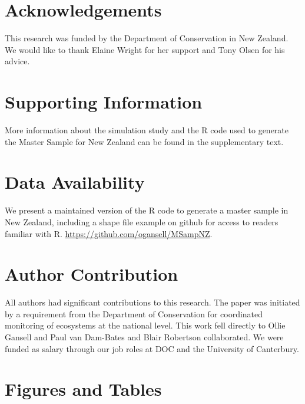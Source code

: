 \documentclass[titlepage]{article}
\begin{document}
\section{Acknowledgements}
This research was funded by the Department of Conservation in New Zealand. We would like to thank Elaine Wright for her support and Tony Olsen for his advice.

	

\section{Supporting Information}
More information about the simulation study and the R code used to generate the Master Sample for New Zealand can be found in the supplementary text.

\section{Data Availability}
We present a maintained version of the R code to generate a master sample in New Zealand, including a shape file example on github for access to readers familiar with R. \url{https://github.com/ogansell/MSampNZ}.

\section{Author Contribution}
All authors had significant contributions to this research. The paper was initiated by a requirement from the Department of Conservation for coordinated monitoring of ecosystems at the national level. This work fell directly to Ollie Gansell and Paul van Dam-Bates and Blair Robertson collaborated. We were funded as salary through our job roles at DOC and the University of Canterbury.

\newpage
\section*{Figures and Tables}
\end{document}
